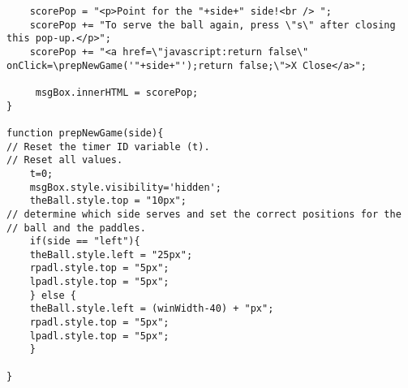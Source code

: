 \documentclass[a4paper,10pt]{article}
\begin{document}
\begin{verbatim}
    scorePop = "<p>Point for the "+side+" side!<br /> ";
    scorePop += "To serve the ball again, press \"s\" after closing this pop-up.</p>";
    scorePop += "<a href=\"javascript:return false\" onClick=\prepNewGame('"+side+"');return false;\">X Close</a>";
     
     msgBox.innerHTML = scorePop;
}

function prepNewGame(side){
// Reset the timer ID variable (t).
// Reset all values.
    t=0;
    msgBox.style.visibility='hidden';
    theBall.style.top = "10px";
// determine which side serves and set the correct positions for the
// ball and the paddles.
    if(side == "left"){
    theBall.style.left = "25px";
    rpadl.style.top = "5px";
    lpadl.style.top = "5px";
    } else {
    theBall.style.left = (winWidth-40) + "px";
    rpadl.style.top = "5px";
    lpadl.style.top = "5px";
    }
   
}
\end{verbatim}
\end{document}
